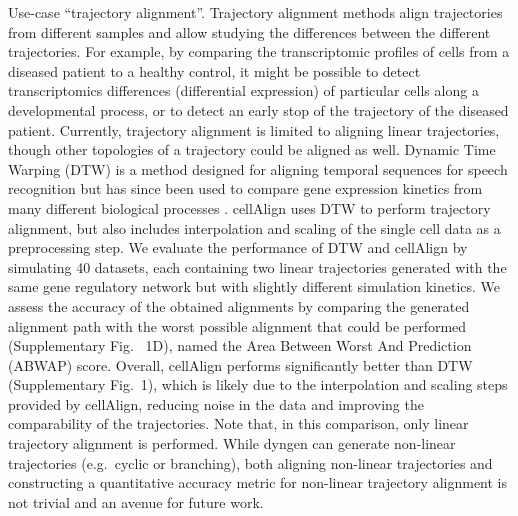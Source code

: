 \documentclass[
  table,
  10pt,
  a4paper]{article}
\begin{document}
Use-case ``trajectory alignment''. Trajectory alignment methods align
trajectories from different samples and allow studying the differences
between the different trajectories. For example, by comparing the
transcriptomic profiles of cells from a diseased patient to a healthy
control, it might be possible to detect transcriptomics differences
(differential expression) of particular cells along a developmental
process, or to detect an early stop of the trajectory of the diseased
patient. Currently, trajectory alignment is limited to aligning linear
trajectories, though other topologies of a trajectory could be aligned
as well. Dynamic Time Warping (DTW)
\autocite{giorgino_computingvisualizingdynamic_2009} is a method
designed for aligning temporal sequences for speech recognition but has
since been used to compare gene expression kinetics from many different
biological processes
\autocite{cacchiarelli_aligningsinglecelldevelopmental_2018,kanton_organoidsinglecellgenomic_2019,mcfaline-figueroa_pooledsinglecellgenetic_2019,alpert_alignmentsinglecelltrajectories_2018}.
cellAlign \autocite{alpert_alignmentsinglecelltrajectories_2018} uses
DTW to perform trajectory alignment, but also includes interpolation and
scaling of the single cell data as a preprocessing step. We evaluate the
performance of DTW and cellAlign by simulating 40 datasets, each
containing two linear trajectories generated with the same gene
regulatory network but with slightly different simulation kinetics. We
assess the accuracy of the obtained alignments by comparing the
generated alignment path with the worst possible alignment that could be
performed (Supplementary Fig. ~1D), named the Area Between Worst And
Prediction (ABWAP) score. Overall, cellAlign performs significantly
better than DTW (Supplementary Fig.~1), which is likely due to the
interpolation and scaling steps provided by cellAlign, reducing noise in
the data and improving the comparability of the trajectories. Note that,
in this comparison, only linear trajectory alignment is performed. While
dyngen can generate non-linear trajectories (e.g.~cyclic or branching),
both aligning non-linear trajectories and constructing a quantitative
accuracy metric for non-linear trajectory alignment is not trivial and
an avenue for future work.
\end{document}
